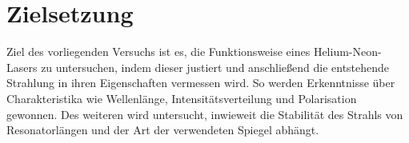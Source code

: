 \section{Zielsetzung}\label{sec:zielsetzung}
Ziel des vorliegenden Versuchs ist es, die Funktionsweise eines Helium-Neon-Lasers zu untersuchen, indem dieser justiert und anschließend die entstehende Strahlung in ihren Eigenschaften vermessen wird. So werden Erkenntnisse über Charakteristika wie Wellenlänge, Intensitätsverteilung und Polarisation gewonnen. Des weiteren wird untersucht, inwieweit die Stabilität des Strahls von Resonatorlängen und der Art der verwendeten Spiegel abhängt.